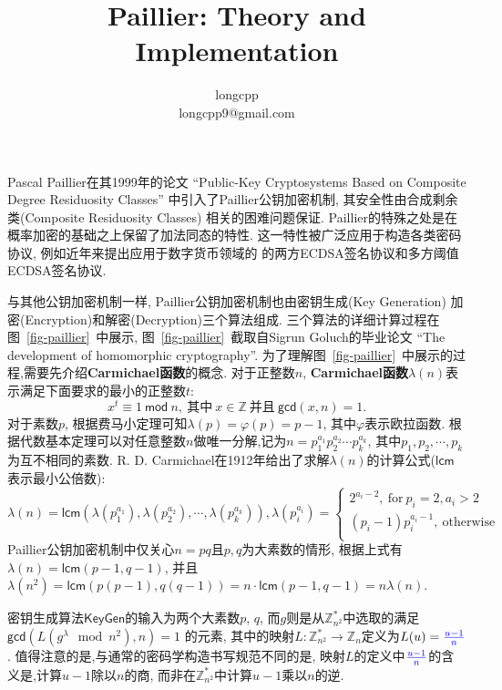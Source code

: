 \documentclass{article}
\newcommand{\Z}{\mathbb{Z}}
\newcommand{\blue}{\textcolor{blue}}
\begin{document}
\title{Paillier: Theory and Implementation}
\author{longcpp \\ \small{longcpp9@gmail.com}}

\maketitle

Pascal Paillier在其1999年的论文
``Public-Key Cryptosystems Based on Composite Degree Residuosity Classes''
中引入了Paillier公钥加密机制, 其安全性由合成剩余类(Composite Residuosity Classes)
相关的困难问题保证. Paillier的特殊之处是在概率加密的基础之上保留了加法同态的特性.
这一特性被广泛应用于构造各类密码协议, 例如近年来提出应用于数字货币领域的
的两方ECDSA签名协议和多方阈值ECDSA签名协议.

与其他公钥加密机制一样, Paillier公钥加密机制也由密钥生成(Key Generation)
加密(Encryption)和解密(Decryption)三个算法组成.
三个算法的详细计算过程在图~\ref{fig-paillier}~中展示, 
图~\ref{fig-paillier}~截取自Sigrun Goluch的毕业论文
``The development of homomorphic cryptography''. 
为了理解图~\ref{fig-paillier}~中展示的过程,需要先介绍\textbf{Carmichael函数}的概念.
对于正整数$n$, \textbf{Carmichael函数$\lambda(n)$}表示满足下面要求的最小的正整数$t$:
$$x^t \equiv 1 ~\textsf{mod}~ n, ~\text{其中}~ x \in \Z ~\text{并且}~ \textsf{gcd}(x, n) = 1.$$
对于素数$p$, 根据费马小定理可知$\lambda(p) = \varphi(p) = p-1$, 其中$\varphi$表示欧拉函数.
根据代数基本定理可以对任意整数$n$做唯一分解,记为$n = p_1^{a_1}p_2^{a_2}\cdots p_k^{a_k}$,
其中$p_1, p_2, \cdots, p_k$为互不相同的素数. 
R. D. Carmichael在1912年给出了求解$\lambda(n)$的计算公式($\textsf{lcm}$表示最小公倍数): 
\begin{equation*}
\lambda(n) = \textsf{lcm}\left(\lambda\left(p_1^{a_1}\right), \lambda\left(p_2^{a_2}\right), \cdots, \lambda\left(p_k^{a_k}\right)\right),
\lambda(p_i^{a_i}) = 
\left\{
\begin{array}{l}
2^{a_i - 2}, ~\text{for}~ p_i = 2, a_i > 2\\
(p_i - 1)p_i^{a_i - 1}, ~\text{otherwise}~\\
\end{array}
\right.
\end{equation*}
Paillier公钥加密机制中仅关心$n = pq$且$p, q$为大素数的情形, 
根据上式有$\lambda(n)=\textsf{lcm}(p-1, q-1)$, 并且
$\lambda(n^2) = \textsf{lcm}(p(p-1), q(q-1)) = n\cdot\textsf{lcm}(p-1, q-1) = n\lambda(n)$.

密钥生成算法$\textsf{KeyGen}$的输入为两个大素数$p$, $q$,
而$g$则是从$\Z_{n^2}^*$中选取的满足
$\textsf{gcd}\left(L\left(g^\lambda \mod n^2\right), n\right) = 1$
的元素, 其中的映射$L: \Z_{n^2}^* \rightarrow \Z_n$定义为$L(u) = \blue{\frac{u-1}{n}}$.
值得注意的是,与通常的密码学构造书写规范不同的是,
映射$L$的定义中$\blue{\frac{u-1}{n}}$的含义是,计算$u-1$除以$n$的商,
而非在$\Z_{n^2}^*$中计算$u-1$乘以$n$的逆.
\end{document}
